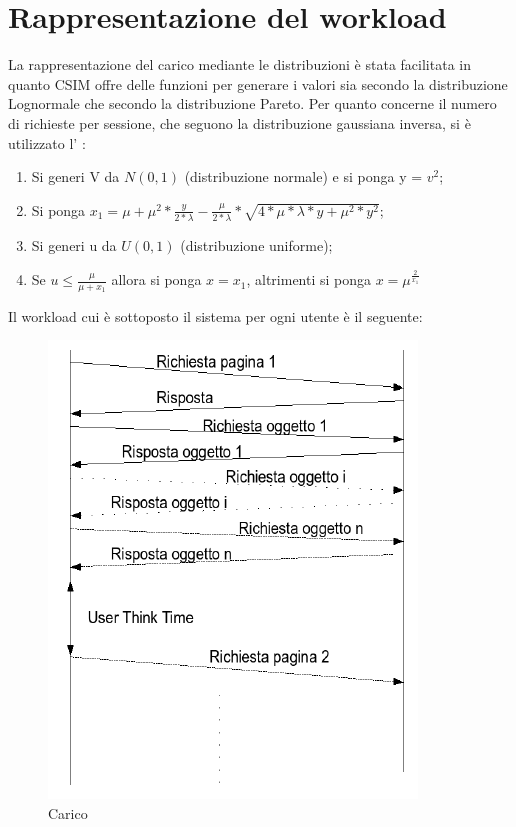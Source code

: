 \section{Rappresentazione del workload}
La rappresentazione del carico mediante le distribuzioni è stata facilitata in quanto CSIM offre delle funzioni per generare i valori sia secondo la distribuzione Lognormale che secondo la distribuzione Pareto. Per quanto concerne il numero di richieste per sessione, che seguono la distribuzione gaussiana inversa, si è utilizzato l' \cite{rif3}:
\begin{enumerate}
	\item Si generi V da $N(0,1)$ (distribuzione normale) e si ponga y = $v^{2}$;
	\item Si ponga $x_{1} =  \mu + \mu^{2}*\frac{y}{2*\lambda} - \frac{\mu}{2*\lambda} * \sqrt{4*\mu*\lambda*y+\mu^{2}*y^{2}}$;
	\item Si generi u da $U(0,1)$ (distribuzione uniforme);
	\item Se $u \leq \frac{\mu}{\mu+x_{1}}$ allora si ponga $x = x_{1}$, altrimenti si ponga $x = \mu^{\frac{2}{x_{1}}}$
\end{enumerate}
Il workload cui è sottoposto il sistema per ogni utente è il seguente:
\begin{figure}[H]
\begin{center}
\includegraphics[scale=0.7]{etc/carico.png}
\caption{Carico}
\label{carico}
\end{center}
\end{figure}
